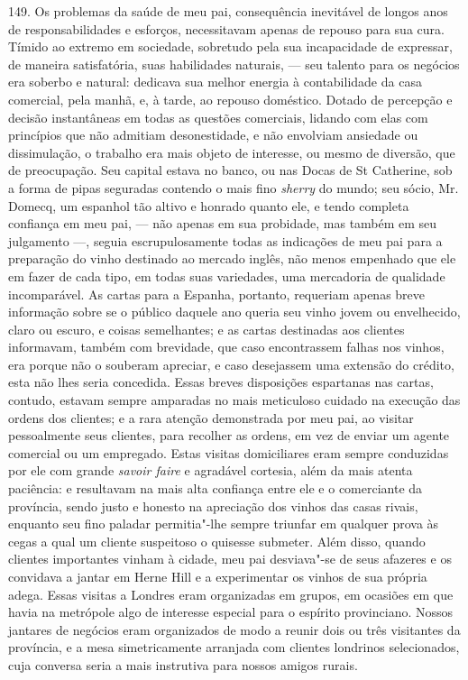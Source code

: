 149. Os problemas da saúde de meu pai, consequência inevitável de longos
anos de responsabilidades e esforços, necessitavam apenas de repouso
para sua cura. Tímido ao extremo em sociedade, sobretudo pela sua
incapacidade de expressar, de maneira satisfatória, suas habilidades
naturais, --- seu talento para os negócios era soberbo e natural:
dedicava sua melhor energia à contabilidade da casa comercial, pela
manhã, e, à tarde, ao repouso doméstico. Dotado de percepção e decisão
instantâneas em todas as questões comerciais, lidando com elas com
princípios que não admitiam desonestidade, e não envolviam ansiedade ou
dissimulação, o trabalho era mais objeto de interesse, ou mesmo de
diversão, que de preocupação. Seu capital estava no banco, ou nas Docas
de St Catherine, sob a forma de pipas seguradas contendo o mais fino
\emph{sherry} do mundo; seu sócio, Mr.\,Domecq, um espanhol tão altivo e
honrado quanto ele, e tendo completa confiança em meu pai, --- não apenas
em sua probidade, mas também em seu julgamento ---, seguia
escrupulosamente todas as indicações de meu pai para a preparação do
vinho destinado ao mercado inglês, não menos empenhado que ele em fazer
de cada tipo, em todas suas variedades, uma mercadoria de qualidade
incomparável. As cartas para a Espanha, portanto, requeriam apenas breve
informação sobre se o público daquele ano queria seu vinho jovem ou
envelhecido, claro ou escuro, e coisas semelhantes; e as cartas
destinadas aos clientes informavam, também com brevidade, que caso
encontrassem falhas nos vinhos, era porque não o souberam apreciar, e
caso desejassem uma extensão do crédito, esta não lhes seria concedida.
Essas breves disposições espartanas nas cartas, contudo, estavam sempre
amparadas no mais meticuloso cuidado na execução das ordens dos
clientes; e a rara atenção demonstrada por meu pai, ao visitar
pessoalmente seus clientes, para recolher as ordens, em vez de enviar um
agente comercial ou um empregado. Estas visitas domiciliares eram sempre
conduzidas por ele com grande \emph{savoir faire} e agradável cortesia,
além da mais atenta paciência: e resultavam na mais alta confiança entre
ele e o comerciante da província, sendo justo e honesto na apreciação
dos vinhos das casas rivais, enquanto seu fino paladar permitia"-lhe
sempre triunfar em qualquer prova às cegas a qual um cliente suspeitoso
o quisesse submeter. Além disso, quando clientes importantes vinham à
cidade, meu pai desviava"-se de seus afazeres e os convidava a jantar em
Herne Hill e a experimentar os vinhos de sua própria adega. Essas
visitas a Londres eram organizadas em grupos, em ocasiões em que havia
na metrópole algo de interesse especial para o espírito provinciano.
Nossos jantares de negócios eram organizados de modo a reunir dois ou
três visitantes da província, e a mesa simetricamente arranjada com
clientes londrinos selecionados, cuja conversa seria a mais instrutiva
para nossos amigos rurais.

